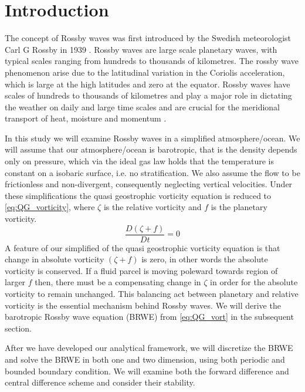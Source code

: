 \section{Introduction}
The concept of Rossby waves was first introduced by the Swedish meteorologist
Carl G Rossby in 1939 \parencite{Rossby1939}. Rossby waves are large scale
planetary waves, with typical scales ranging from 
hundreds to thousands of kilometres. The rossby wave phenomenon arise due to the
latitudinal variation in the Coriolis acceleration, which is large at the
high latitudes and zero at the equator. Rossby waves have scales of
hundreds to thousands of kilometres and play a major role in dictating
the weather on daily and large time scales and are crucial for the meridional
transport of heat, moisture and momentum \parencite{midSynDyn}.  

In this study we will examine Rossby waves in a simplified 
atmosphere/ocean. We will assume that our atmosphere/ocean is barotropic, that
is the density depends only on pressure, which via the ideal gas law holds that
the temperature is constant on a isobaric surface, i.e. no stratification. We also assume the flow to be frictionless and
non-divergent, consequently neglecting vertical velocities. Under these
simplifications the quasi geostrophic vorticity equation is reduced to
\cref{eq:QG_vorticity}, where $\zeta$ is the relative vorticity and $f$ is the
planetary vorticity. 
\begin{equation}\label{eq:QG_vorticity}
    \frac{D(\zeta + f)}{Dt} = 0
\end{equation}
A feature of our simplified of the quasi geostrophic vorticity equation is that
change in absolute vorticity $(\zeta + f)$ is zero, in other words the absolute
vorticity is conserved. If a fluid parcel is moving
poleward towards region of larger $f$ then, there must be a compensating change
in $\zeta$ in order for the absolute vorticity to remain unchanged. This
balancing act between planetary and relative vorticity is the essential
mechanism behind
Rossby waves. We will derive the barotropic Rossby
wave equation (BRWE) from \cref{eq:QG_vort} in the subsequent section.

After we have developed our analytical framework, we will discretize the BRWE
and solve the BRWE in both one and two dimension, using both periodic and
bounded boundary condition. We will examine both the forward
difference and central difference scheme and consider their stability.  